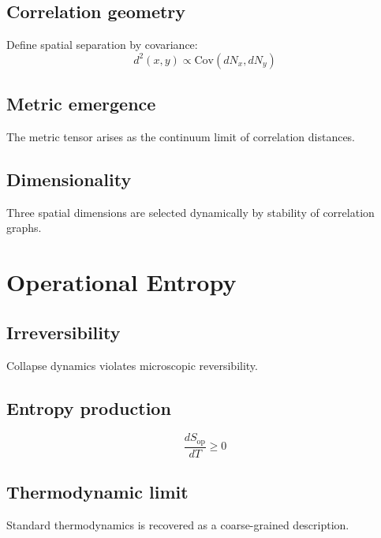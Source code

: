 \documentclass[11pt]{book}
\begin{document}
\section{Correlation geometry}

Define spatial separation by covariance:
\begin{equation}
d^2(x,y) \propto \mathrm{Cov}(dN_x,dN_y)
\end{equation}

\section{Metric emergence}

The metric tensor arises as the continuum limit of correlation distances.

\section{Dimensionality}

Three spatial dimensions are selected dynamically by stability of correlation
graphs.

\chapter{Operational Entropy}

\section{Irreversibility}

Collapse dynamics violates microscopic reversibility.

\section{Entropy production}

\begin{equation}
\frac{dS_{\mathrm{op}}}{dT} \ge 0
\end{equation}

\section{Thermodynamic limit}

Standard thermodynamics is recovered as a coarse-grained description.
\end{document}
